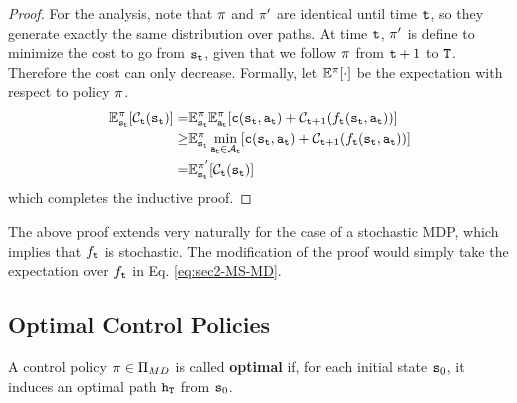 \begin{proof}
For the analysis, note that $\pi$ and $\pi'$ are identical
until time ${\tt t}$, so they generate exactly the same distribution
over paths. At time ${\tt t}$, $\pi'$ is define to minimize the
cost to go from ${\tt s}_{\tt t}$, given that we follow $\pi$ from
${\tt t}+1$ to ${\tt T}$. Therefore the cost can only decrease.
Formally, let $\mathbb{E}^\pi[\cdot]$ be the expectation with respect to
policy $\pi$.
\begin{align*}
\mathbb{E}^\pi_{{\tt s}_{\tt t}}[\mathcal{C}_{{\tt t}}({\tt s}_{\tt t})]
= & \mathbb{E}^\pi_{{\tt s}_{\tt t}}
\mathbb{E}^\pi_{{\tt a}_{\tt t}}[{\tt c}({\tt s}_{\tt t},{\tt a}_{\tt t})+\mathcal{C}_{{\tt t}+1}(f_{\tt t}({\tt s}_{\tt t},{\tt a}_{\tt t}))]\\
\geq & \mathbb{E}^\pi_{{\tt s}_{\tt t}} \min_{{\tt a}_{\tt t}\in
\mathcal{A}_{\tt t}}[{\tt c}({\tt s}_{\tt t},{\tt a}_{\tt t})+\mathcal{C}_{{\tt t}+1}(f_{\tt t}({\tt s}_{\tt t},{\tt a}_{\tt t}))]\\
= & \mathbb{E}^{\pi'}_{{\tt s}_{\tt t}} [\mathcal{C}_{\tt t} ({\tt s}_{\tt t})]
\end{align*}
which completes the inductive proof.
%
\end{proof}

\begin{remark}
The above proof extends very naturally for the case of a stochastic
MDP, which implies that $f_{\tt t}$ is stochastic. The modification
of the proof would simply take the expectation over $f_{\tt t}$ in
Eq. \ref{eq:sec2-MS-MD}.
\end{remark}



\subsection{Optimal Control Policies}

\begin{definition}
A control policy $\pi\in\Pi_{MD} $ is called \textbf{optimal}
if, for each initial state ${{\tt s}_0}$, it induces an optimal path
${{\tt h}_{\tt T}}$ from ${{\tt s}_0}$.
\end{definition}

